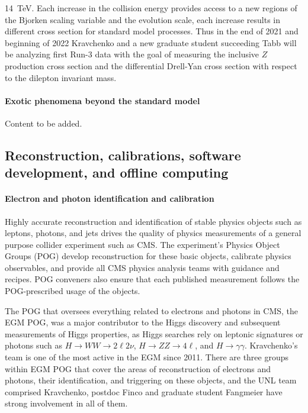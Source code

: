 14~TeV. Each increase in the collision energy provides access to a new regions of the Bjorken scaling variable and the evolution scale, each increase results in different cross section for standard model processes. Thus in the end of 2021 and beginning of 2022 Kravchenko and a new graduate student succeeding Tabb will be analyzing first Run-3 data with the goal of measuring the inclusive $Z$ production cross section and the differential Drell-Yan cross section with respect to the dilepton invariant mass.

\paragraph{Exotic phenomena beyond the standard model}
 Content to be added.


\subsection{Reconstruction, calibrations, software development, and offline computing}

\paragraph{Electron and photon identification and calibration}
Highly accurate reconstruction and identification of stable physics objects such as leptons, photons, and jets drives the quality of physics measurements of a general purpose collider experiment such as CMS. The experiment's Physics Object Groups (POG) develop reconstruction for these basic objects, calibrate physics observables, and provide all CMS physics analysis teams  with guidance and recipes. POG conveners also ensure that each published measurement follows the POG-prescribed usage of the objects. 

The POG that oversees everything related to electrons and photons in CMS, the EGM POG,  was a major contributor to the Higgs discovery and subsequent measurements of Higgs properties, as Higgs searches rely on leptonic signatures or photons such as $H\rightarrow WW\rightarrow 2\ell 2\nu$, $H\rightarrow ZZ\rightarrow 4\ell$, and $H\rightarrow \gamma\gamma$. Kravchenko's team is one of the most active in the EGM since 2011. There are three groups within EGM POG that cover the areas of reconstruction of electrons and photons, their identification, and triggering on these objects, and the UNL team comprised Kravchenko, postdoc Finco and graduate student Fangmeier have strong involvement in all of them. 

